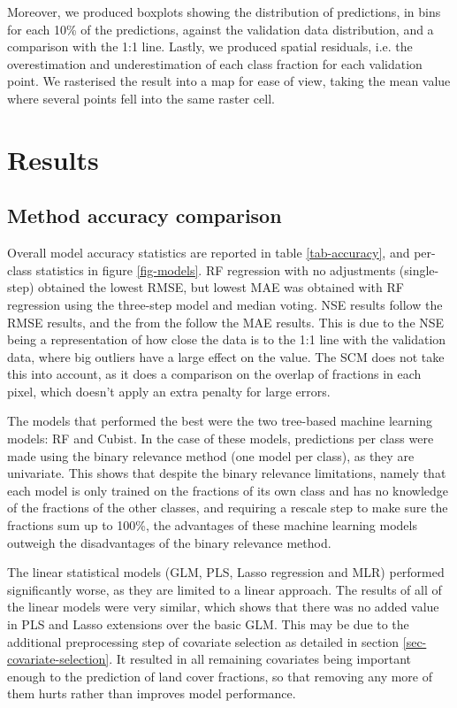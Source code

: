\documentclass[review,authoryear,3p]{elsarticle}
\begin{document}
Moreover, we produced boxplots showing the distribution of predictions, in bins for each 10\% of the predictions, against the validation data distribution, and a comparison with the 1:1 line.
Lastly, we produced spatial residuals, i.e. the overestimation and underestimation of each class fraction for each validation point.
We rasterised the result into a map for ease of view, taking the mean value where several points fell into the same raster cell.

\section{Results}

\subsection{Method accuracy comparison}

Overall model accuracy statistics are reported in table \ref{tab-accuracy}, and per-class statistics in figure \ref{fig-models}.
\Gls{RF} regression with no adjustments (single-step) obtained the lowest \gls{RMSE}, but lowest \gls{MAE} was obtained with \gls{RF} regression using the three-step model and median voting.
\gls{NSE} results follow the \gls{RMSE} results, and the  from the  follow the \gls{MAE} results.
This is due to the \gls{NSE} being a representation of how close the data is to the 1:1 line with the validation data, where big outliers have a large effect on the value.
The \gls{SCM} does not take this into account, as it does a comparison on the overlap of fractions in each pixel, which doesn't apply an extra penalty for large errors.

The models that performed the best were the two tree-based machine learning models: \gls{RF} and Cubist.
In the case of these models, predictions per class were made using the binary relevance method (one model per class), as they are univariate.
This shows that despite the binary relevance limitations, namely that each model is only trained on the fractions of its own class and has no knowledge of the fractions of the other classes, and requiring a rescale step to make sure the fractions sum up to 100\%, the advantages of these machine learning models outweigh the disadvantages of the binary relevance method.

The linear statistical models (\gls{GLM}, \gls{PLS}, Lasso regression and \gls{MLR}) performed significantly worse, as they are limited to a linear approach.
The results of all of the linear models were very similar, which shows that there was no added value in \gls{PLS} and Lasso extensions over the basic \gls{GLM}.
This may be due to the additional preprocessing step of covariate selection as detailed in section \ref{sec-covariate-selection}.
It resulted in all remaining covariates being important enough to the prediction of land cover fractions, so that removing any more of them hurts rather than improves model performance.
\end{document}
